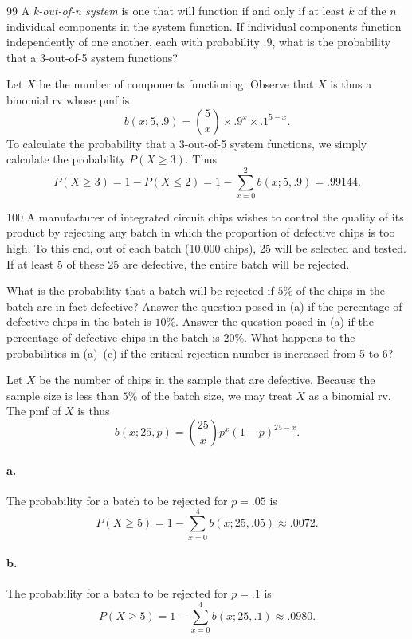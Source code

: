 \documentclass{exam}
\begin{document}
\begin{problem}{99}
	A \textit{k-out-of-n system} is one that will function if and only if at least $k$ of the $n$ individual components in the system function. If individual components function independently of one another, each with probability $.9$, what is the probability that a 3-out-of-5 system functions?
\end{problem}

Let $X$ be the number of components functioning. Observe that $X$ is thus a binomial rv whose pmf is
\[
	b(x; 5, .9) = \binom5x \times .9^x \times .1^{5 - x}.
\]
To calculate the probability that a 3-out-of-5 system functions, we simply calculate the probability $P(X \ge 3)$. Thus
\[
	P(X \ge 3) = 1 - P(X \le 2) = 1 - \sum_{x = 0}^2 b(x; 5, .9) = .99144.
\]

\begin{problem}{100}
	A manufacturer of integrated circuit chips wishes to control the quality of its product by rejecting any batch in which the proportion of defective chips is too high. To this end, out of each batch (10,000 chips), 25 will be selected and tested. If at least 5 of these 25 are defective, the entire batch will be rejected.
	\begin{tasks}[label=\textbf{\alph*.}]
		\task What is the probability that a batch will be rejected if $5\%$ of the chips in the batch are in fact defective?
		\task Answer the question posed in (a) if the percentage of defective chips in the batch is $10\%$.
		\task Answer the question posed in (a) if the percentage of defective chips in the batch is $20\%$.
		\task What happens to the probabilities in (a)--(c) if the critical rejection number is increased from 5 to 6?
	\end{tasks}
\end{problem}

Let $X$ be the number of chips in the sample that are defective. Because the sample size is less than $5\%$ of the batch size, we may treat $X$ as a binomial rv. The pmf of $X$ is thus
\[
	b(x; 25, p) = \binom{25}x p^x(1 - p)^{25 - x}.
\]

\paragraph{a.} The probability for a batch to be rejected for $p = .05$ is
\[
	P(X \ge 5) =  1 - \sum_{x = 0}^4 b(x; 25, .05) \approx .0072.
\]

\paragraph{b.} The probability for a batch to be rejected for $p = .1$ is
\[
	P(X \ge 5) = 1 - \sum_{x = 0}^4 b(x; 25, .1) \approx .0980.
\]
	
\end{document}
